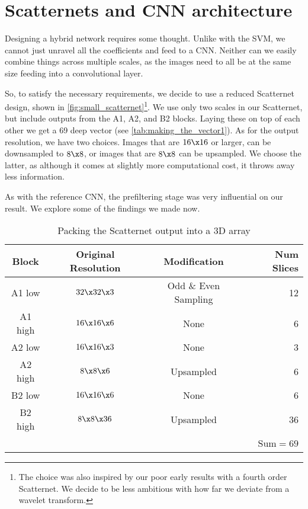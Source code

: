 \section{Scatternets and CNN architecture}
  Designing a hybrid network requires some thought. Unlike with the SVM, we cannot just
  unravel all the coefficients and feed to a CNN\@. Neither can we easily combine
  things across multiple scales, as the images need to all be at the same size
  feeding into a convolutional layer.

  So, to satisfy the necessary requirements, we decide to use a reduced
  Scatternet design, shown in \autoref{fig:small_scatternet}\footnote{The
  choice was also inspired by our poor early results with a fourth order
  Scatternet. We decide to be less ambitious with how far we deviate from
  a wavelet transform.}. We use only two scales in our Scatternet, but include
  outputs from the A1, A2, and B2 blocks. Laying these on top of each other we
  get a 69 deep vector (see \autoref{tab:making_the_vector1}). As for the
  output resolution, we have two choices. Images that are $16\x16$ or larger,
  can be downsampled to $8\x 8$, or images that are $8\x 8$ can be upsampled.
  We choose the latter, as although it comes at slightly more computational
  cost, it throws away less information.

  As with the reference CNN, the prefiltering stage was very influential on our
  result. We explore some of the findings we made now.

  \begin{table}
    \caption{Packing the Scatternet output into a 3D array}
    \label{tab:making_the_vector1}
    \begin{center}
    \begin{tabular}{cccr}\toprule 
      \textbf{Block} & \textbf{Original Resolution} & \textbf{Modification}
      & \textbf{Num Slices} \Tstrut\Bstrut\\ \midrule
      A1 low & $32\x 32\x 3$ & Odd \& Even Sampling & 12\Tstrut\\
      A1 high & $16\x 16\x 6$ & None & 6\\
      A2 low & $16\x16\x3$ & None & 3\\
      A2 high & $8\x8\x6$ & Upsampled & 6\\
      B2 low & $16\x16\x6$ & None & 6\\
      B2 high & $8\x8\x36$ & Upsampled & 36\Bstrut\\\midrule
      & & & Sum$=69$\Tstrut\Bstrut\\\bottomrule
    \end{tabular}
    \end{center}
  \end{table}



